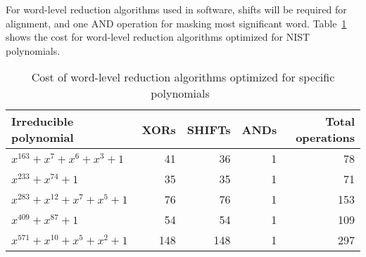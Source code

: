 For word-level reduction algorithms used in software, shifts will be required for alignment, and one AND operation for masking most significant word. Table~\ref{table:word_reduction_hankerson} shows the cost for word-level reduction algorithms optimized for NIST polynomials.

\begin{table}
\centering
\caption{Cost of word-level reduction algorithms optimized for specific polynomials~\cite[p. 55]{hankerson2006guide}}
{\begin{tabular}{l r r r r} \label{table:word_reduction_hankerson}
Irreducible polynomial & XORs & SHIFTs & ANDs & Total operations \\ \hline
$x^{163} + x^7 + x^6 + x^3 + 1$ & 41 & 36 & 1 & 78 \\
$x^{233} + x^{74} + 1$ & 35 & 35 & 1 & 71 \\
$x^{283} + x^{12} + x^7 + x^5 + 1$ & 76 & 76 & 1 & 153 \\
$x^{409} + x^{87} + 1$ & 54 & 54 & 1 & 109 \\
$x^{571} + x^{10} + x^5 + x^2 + 1$ & 148 & 148 & 1 & 297
\end{tabular}}{}
\end{table}